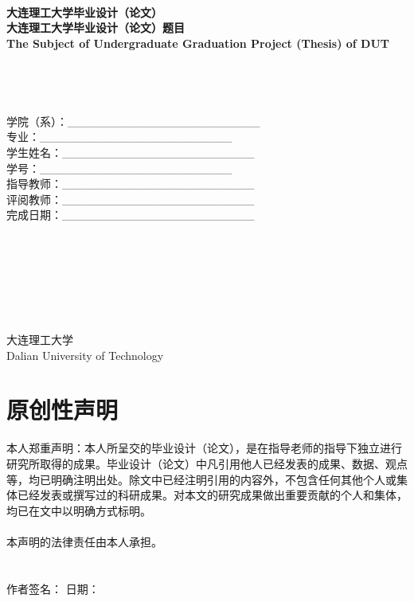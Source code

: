 \documentclass[UTF8,a4paper]{ctexart}
\numberwithin{table}{section}
\numberwithin{equation}{section}
\begin{document}
	\begin{titlepage}
		\begin{center}
			~\\[1pt]
			 {\bf{大连理工大学毕业设计（论文）}}
			~\\[12pt]
			 {\bf{大连理工大学毕业设计（论文）题目}}\\
			 {\bf{The Subject of Undergraduate Graduation Project (Thesis) of DUT}}
			~\\
			~\\
			~\\
			~\\
			~\\
			 {学院（系）：\_\_\_\_\_\_\_\_\_\_\_\_\_\_\_\_\_\_\_\_\_\_\_}\\
			 {专业：\_\_\_\_\_\_\_\_\_\_\_\_\_\_\_\_\_\_\_\_\_\_\_}\\
			 {学生姓名：\_\_\_\_\_\_\_\_\_\_\_\_\_\_\_\_\_\_\_\_\_\_\_}\\
			 {学号：\_\_\_\_\_\_\_\_\_\_\_\_\_\_\_\_\_\_\_\_\_\_\_}\\
			 {指导教师：\_\_\_\_\_\_\_\_\_\_\_\_\_\_\_\_\_\_\_\_\_\_\_}\\
			 {评阅教师：\_\_\_\_\_\_\_\_\_\_\_\_\_\_\_\_\_\_\_\_\_\_\_}\\
			 {完成日期：\_\_\_\_\_\_\_\_\_\_\_\_\_\_\_\_\_\_\_\_\_\_\_}\\
			~\\
			~\\
			~\\
			~\\
			~\\
			~\\
			~\\
			大连理工大学\\
			Dalian University of Technology
		\end{center}
	\newpage
	\end{titlepage}
	
	\newpage
	
	\section*{\fontsize{15}{22.5} {\heiti 原创性声明}}
	本人郑重声明：本人所呈交的毕业设计（论文），是在指导老师的指导下独立进行研究所取得的成果。毕业设计（论文）中凡引用他人已经发表的成果、数据、观点等，均已明确注明出处。除文中已经注明引用的内容外，不包含任何其他个人或集体已经发表或撰写过的科研成果。对本文的研究成果做出重要贡献的个人和集体，均已在文中以明确方式标明。\\
	~\\
	本声明的法律责任由本人承担。\\
	~\\
	~\\
	作者签名： \quad \quad \quad \quad \quad \quad 日\quad 期：
	\newpage
\end{document}
